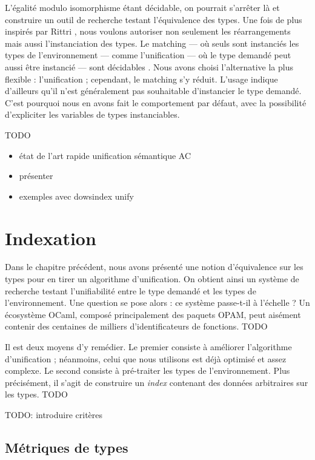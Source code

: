 \documentclass [a4paper] {report}
\theoremstyle {definition}
\begin{document}
L'égalité modulo isomorphisme étant décidable, on pourrait s'arrêter là et construire un outil de recherche testant l'équivalence des types. Une fois de plus inspirés par Rittri \cite {rittri93}, nous voulons autoriser non seulement les réarrangements mais aussi l'instanciation des types. Le matching — où seuls sont instanciés les types de l'environnement — comme l'unification — où le type demandé peut aussi être instancié — sont décidables \cite {narendran_pfenning_statman}. Nous avons choisi l'alternative la plus flexible : l'unification ; cependant, le matching s'y réduit. L'usage indique d'ailleurs qu'il n'est généralement pas souhaitable d'instancier le type demandé. C'est pourquoi nous en avons fait le comportement par défaut, avec la possibilité d'expliciter les variables de types instanciables.

TODO
\begin {itemize}
	\item état de l'art rapide unification sémantique AC
	\item présenter \cite {boudet}
	\item exemples avec dowsindex unify
\end {itemize}


\chapter {Indexation}

Dans le chapitre précédent, nous avons présenté une notion d'équivalence sur les types pour en tirer un algorithme d'unification. On obtient ainsi un système de recherche testant l'unifiabilité entre le type demandé et les types de l'environnement. Une question se pose alors : ce système passe-t-il à l'échelle ? Un écosystème OCaml, composé principalement des paquets OPAM, peut aisément contenir des centaines de milliers d'identificateurs de fonctions. TODO

Il est deux moyens d'y remédier. Le premier consiste à améliorer l'algorithme d'unification ; néanmoins, celui que nous utilisons est déjà optimisé et assez complexe. Le second consiste à pré-traiter les types de l'environnement. Plus précisément, il s'agit de construire un \emph {index} contenant des données arbitraires sur les types. TODO

TODO: introduire critères

\section {Métriques de types}
\end{document}

